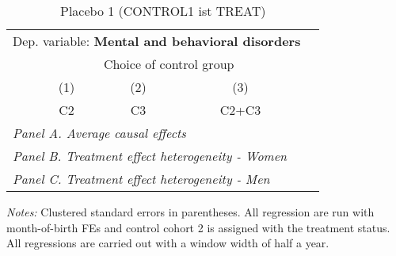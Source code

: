  \begin{table}[H] \centering \begin{threeparttable} \caption{Placebo 1 (CONTROL1 ist TREAT) } {\def\sym#1{\ifmmode^{#1}\else\(^{#1}\)\fi} \begin{tabular}{l*{4}{c}} \toprule \multicolumn{4}{l}{Dep. variable: \textbf{Mental and behavioral disorders}} \\ & \multicolumn{3}{c}{Choice of control group} \\ \cmidrule(lr){2-4}
            &\multicolumn{1}{c}{(1)}&\multicolumn{1}{c}{(2)}&\multicolumn{1}{c}{(3)}\\
            &\multicolumn{1}{c}{C2}&\multicolumn{1}{c}{C3}&\multicolumn{1}{c}{C2+C3}\\
\midrule
 \multicolumn{4}{l}{\emph{Panel A. Average causal effects}} \\      \midrule\multicolumn{4}{l}{\emph{Panel B. Treatment effect heterogeneity - Women}} \\      \midrule\multicolumn{4}{l}{\emph{Panel C. Treatment effect heterogeneity - Men}} \\      
\bottomrule \end{tabular} } \begin{tablenotes} \item \scriptsize \emph{Notes:} Clustered standard errors in parentheses. All regression are run with month-of-birth FEs and control cohort 2 is assigned with the treatment status. All regressions are carried out with a window width of half a year. \end{tablenotes} \end{threeparttable} \end{table} 
